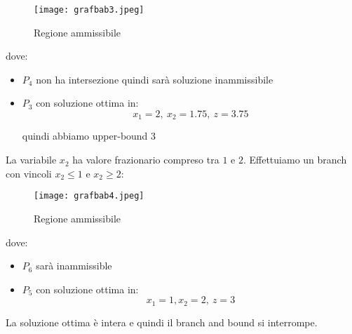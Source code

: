 \begin{figure}[H]
\centering
\texttt{[image: grafbab3.jpeg]}
\caption{Regione ammissibile} 
\label{grafbab3}
\end{figure}

dove:

\begin{itemize}
    \item $P_4$ non ha intersezione quindi sarà soluzione inammissibile
    \item $P_3$ con soluzione ottima in:
        $$x_1 = 2,\ x_2 = 1.75,\ z = 3.75$$
        
        quindi abbiamo upper-bound $3$
\end{itemize}

La variabile $x_2$ ha valore frazionario compreso tra $1$ e $2$. Effettuiamo un branch con vincoli $x_2 \leq 1$ e $x_2 \geq 2$:

\begin{figure}[H]
\centering
\texttt{[image: grafbab4.jpeg]}
\caption{Regione ammissibile} 
\label{grafbab4}
\end{figure}

dove:

\begin{itemize}
    \item $P_6$ sarà inammissible
    \item $P_5$ con soluzione ottima in:
        $$x_1 = 1, x_2 = 2,\ z = 3$$

\end{itemize}

La soluzione ottima è intera e quindi il branch and bound si interrompe.